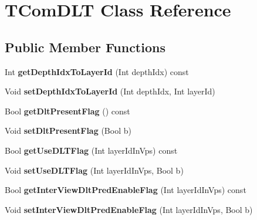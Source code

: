 \hypertarget{class_t_com_d_l_t}{}\section{T\+Com\+D\+LT Class Reference}
\label{class_t_com_d_l_t}
\subsection*{Public Member Functions}
\begin{DoxyCompactItemize}
\item 
\mbox{\label{class_t_com_d_l_t_a8f3d4ef77e20736da059f3ca116d1337}} 
Int {\bfseries get\+Depth\+Idx\+To\+Layer\+Id} (Int depth\+Idx) const
\item 
\mbox{\label{class_t_com_d_l_t_a201790c1ec944acdcb94c1b0518fe850}} 
Void {\bfseries set\+Depth\+Idx\+To\+Layer\+Id} (Int depth\+Idx, Int layer\+Id)
\item 
\mbox{\label{class_t_com_d_l_t_ac85581f000ea33307111768ad7c2dacc}} 
Bool {\bfseries get\+Dlt\+Present\+Flag} () const
\item 
\mbox{\label{class_t_com_d_l_t_affb52a99670c6dd3b93a9bc1e11ba998}} 
Void {\bfseries set\+Dlt\+Present\+Flag} (Bool b)
\item 
\mbox{\label{class_t_com_d_l_t_a8e0b8dc1ebf8c0cf94507965aee8224b}} 
Bool {\bfseries get\+Use\+D\+L\+T\+Flag} (Int layer\+Id\+In\+Vps) const
\item 
\mbox{\label{class_t_com_d_l_t_aff152d079912560db0eb9c58c70b5eaa}} 
Void {\bfseries set\+Use\+D\+L\+T\+Flag} (Int layer\+Id\+In\+Vps, Bool b)
\item 
\mbox{\label{class_t_com_d_l_t_ab9e1ab44dbd5597c920b24da69ec2b71}} 
Bool {\bfseries get\+Inter\+View\+Dlt\+Pred\+Enable\+Flag} (Int layer\+Id\+In\+Vps) const
\item 
\mbox{\label{class_t_com_d_l_t_a7f7448cee61b94cbbf498a3a1116ba62}} 
Void {\bfseries set\+Inter\+View\+Dlt\+Pred\+Enable\+Flag} (Int layer\+Id\+In\+Vps, Bool b)
\item 

\end{DoxyCompactItemize}
